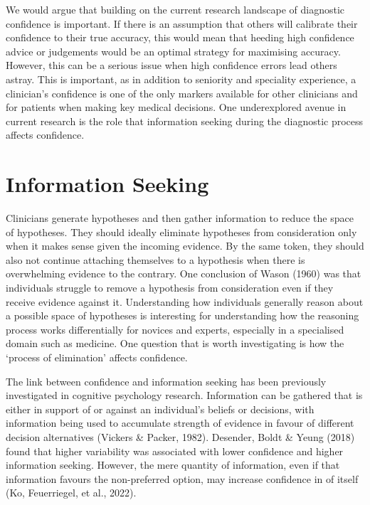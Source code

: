 \documentclass[a4paper, nobind]{templates/ociamthesis}
\begin{document}
We would argue that building on the current research landscape of diagnostic confidence is important. If there is an assumption that others will calibrate their confidence to their true accuracy, this would mean that heeding high confidence advice or judgements would be an optimal strategy for maximising accuracy. However, this can be a serious issue when high confidence errors lead others astray. This is important, as in addition to seniority and speciality experience, a clinician's confidence is one of the only markers available for other clinicians and for patients when making key medical decisions. One underexplored avenue in current research is the role that information seeking during the diagnostic process affects confidence.

\hypertarget{information-seeking}{%
\section*{Information Seeking}\label{information-seeking}}

Clinicians generate hypotheses and then gather information to reduce the space of hypotheses. They should ideally eliminate hypotheses from consideration only when it makes sense given the incoming evidence. By the same token, they should also not continue attaching themselves to a hypothesis when there is overwhelming evidence to the contrary. One conclusion of Wason (1960) was that individuals struggle to remove a hypothesis from consideration even if they receive evidence against it. Understanding how individuals generally reason about a possible space of hypotheses is interesting for understanding how the reasoning process works differentially for novices and experts, especially in a specialised domain such as medicine. One question that is worth investigating is how the `process of elimination' affects confidence.

The link between confidence and information seeking has been previously investigated in cognitive psychology research. Information can be gathered that is either in support of or against an individual's beliefs or decisions, with information being used to accumulate strength of evidence in favour of different decision alternatives (Vickers \& Packer, 1982). Desender, Boldt \& Yeung (2018) found that higher variability was associated with lower confidence and higher information seeking. However, the mere quantity of information, even if that information favours the non-preferred option, may increase confidence in of itself (Ko, Feuerriegel, et al., 2022).
\end{document}
